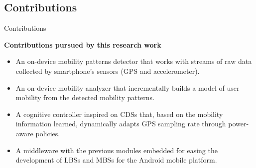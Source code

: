 \subsection{Contributions}
\begin{frame}{Contributions}
\small
\begin{block}{\small \textbf{Contributions pursued by this research work}}
\begin{itemize}
  \item An on-device mobility patterns detector that works with streams of raw data collected by smartphone's sensors (GPS and accelerometer).
  \item An on-device mobility analyzer that incrementally builds a model of user mobility from the detected mobility patterns.
  \item A cognitive controller inspired on CDSs that, based on the mobility information learned, dynamically adapts GPS sampling rate through power-aware policies. 
  \item A middleware with the previous modules embedded for easing the development of LBSs and MBSs for the Android mobile platform.
\end{itemize}
\end{block}
\end{frame}